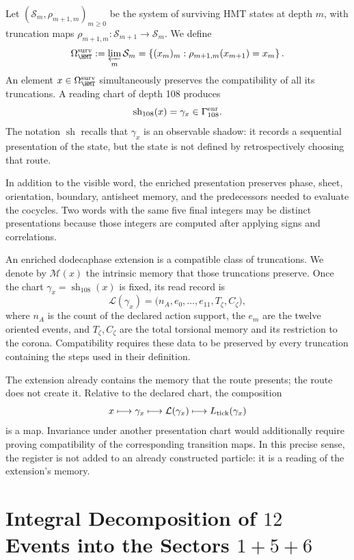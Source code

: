 Let \((\mathcal S_m,\rho_{m+1,m})_{m\geq0}\) be the system of surviving HMT states
at depth \(m\), with truncation maps
\(\rho_{m+1,m}:\mathcal S_{m+1}\to\mathcal S_m\). We define
\[
 \Omega_{\HMT}^{\rm surv}
 :=\varprojlim_m\mathcal S_m
 =\left\{(x_m)_m:\rho_{m+1,m}(x_{m+1})=x_m\right\}.
\]
An element \(x\in\Omega_{\HMT}^{\rm surv}\) simultaneously preserves the
compatibility of all its truncations. A reading chart of depth
108 produces
\[
 \operatorname{sh}_{108}(x)=\gamma_x\in\Gamma_{108}^{\rm enr}.
\]
The notation \(\operatorname{sh}\) recalls that \(\gamma_x\) is an
observable shadow: it records a sequential presentation of the state, but the state is not
defined by retrospectively choosing that route.

In addition to the visible word, the enriched presentation preserves phase,
sheet, orientation, boundary, antisheet memory, and the predecessors needed to
evaluate the cocycles. Two words with the same five final integers may
be distinct presentations because those integers are computed after
applying signs and correlations.

\begin{definition}
An enriched dodecaphase extension is a compatible class of
truncations. We denote by \(\mathscr M(x)\) the intrinsic memory that those
truncations preserve. Once the chart
\(\gamma_x=\operatorname{sh}_{108}(x)\) is fixed, its read record is
\[
 \mathcal L(\gamma_x)
 =\bigl(n_A,e_0,\ldots,e_{11},T_\zeta,C_\zeta\bigr),
\]
where \(n_A\) is the count of the declared action support, the \(e_m\) are
the twelve oriented events, and \(T_\zeta,C_\zeta\) are the total torsional memory
and its restriction to the corona. Compatibility requires these data to
be preserved by every truncation containing the steps used in their
definition.
\end{definition}

The extension already contains the memory that the route presents; the route does not create it.
Relative to the declared chart, the composition
\[
x\longmapsto\gamma_x
\longmapsto\mathcal L(\gamma_x)
\longmapsto L_{\rm tick}(\gamma_x)
\]
is a map. Invariance under another presentation chart would additionally
require proving compatibility of the corresponding transition
maps. In this precise sense, the register is not added to an already
constructed particle: it is a reading of the extension's memory.

\section{Integral Decomposition of \(12\) Events into the Sectors \(1+5+6\)}

